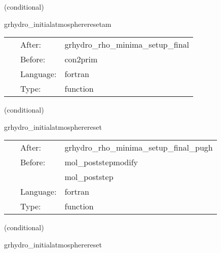 \vspace{5mm}

   (conditional) 

\hspace{5mm} grhydro\_initialatmosphereresetam 

\hspace{5mm}{\it use mask to enforce atmosphere at initial time } 


\hspace{5mm}

 \begin{tabular*}{160mm}{cll} 
~ & After:  & grhydro\_rho\_minima\_setup\_final \\ 
~ & Before:  & con2prim \\ 
~ & Language:  & fortran \\ 
~ & Type:  & function \\ 
\end{tabular*} 


\vspace{5mm}

   (conditional) 

\hspace{5mm} grhydro\_initialatmospherereset 

\hspace{5mm}{\it use mask to enforce atmosphere at initial time } 


\hspace{5mm}

 \begin{tabular*}{160mm}{cll} 
~ & After:  & grhydro\_rho\_minima\_setup\_final\_pugh \\ 
~ & Before:  & mol\_poststepmodify \\ 
~& ~ &mol\_poststep\\ 
~ & Language:  & fortran \\ 
~ & Type:  & function \\ 
\end{tabular*} 


\vspace{5mm}

   (conditional) 

\hspace{5mm} grhydro\_initialatmospherereset 

\hspace{5mm}{\it use mask to enforce atmosphere at initial time } 


\hspace{5mm}

